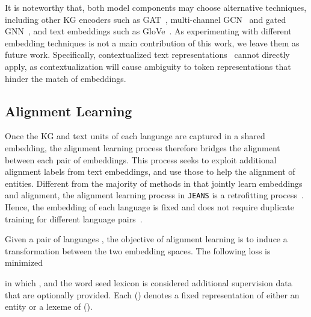 \documentclass[11pt,a4paper]{article}
\newcommand{\modelname}[0]{\texttt{JEANS}\xspace}
\begin{document}
It is noteworthy that, both model components may choose alternative techniques, including other KG encoders such as GAT~\cite{velivckovic2018gat}, multi-channel GCN~\cite{cao2019multi} and gated GNN~\cite{sun2020alinet}, and text embeddings such as GloVe~\cite{pennington2014glove}.
As experimenting with different embedding techniques is not a main contribution of this work, we leave them as future work.
Specifically, contextualized text representations~\cite{peters2018deep,devlin2019bert} cannot directly apply, as contextualization will cause ambiguity to token representations that hinder the match of embeddings.

\subsection{Alignment Learning}

Once the KG and text units of each language are captured in a shared embedding,
the alignment learning process therefore bridges the alignment between each pair of embeddings.
This process seeks to exploit additional alignment labels from text embeddings,
and use those to help the alignment of entities.
Different from the majority of methods in  that jointly learn embeddings and alignment, the alignment learning process in \modelname is a retrofitting process~\cite{shi2019retrofit,faruqui2015retrofitting}.
Hence, the embedding of each language is fixed and does not require duplicate training for different language pairs~\cite{chen2017multigraph,sun2017cross}.



Given a pair of languages , the objective of alignment learning is to induce a transformation  between the two embedding spaces. The following loss is minimized



\noindent
in which , and the word seed lexicon  is considered additional supervision data that are optionally provided.
Each  () denotes a fixed representation of either an entity or a lexeme of  ().
\end{document}
